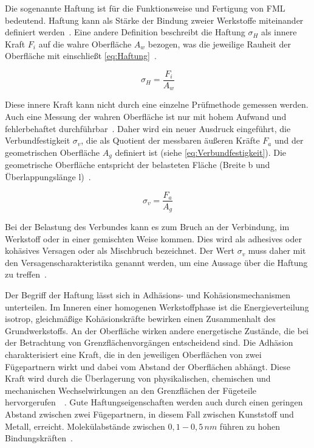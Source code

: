Die sogenannte Haftung ist für die Funktionsweise und Fertigung von FML bedeutend.
Haftung kann als Stärke der Bindung zweier Werkstoffe miteinander definiert werden~\cite{Mann1994}.
Eine andere Definition beschreibt die Haftung $\sigma_H$ als innere Kraft $F_i$ auf die wahre Oberfläche $A_w$ bezogen, was die jeweilige Rauheit der Oberfläche mit einschließt \autoref{eq:Haftung}~\cite{Bischof1993}.

\begin{equation}
    \sigma_H = \frac{F_i}{A_w}
    \label{eq:Haftung}
\end{equation}

Diese innere Kraft kann nicht durch eine einzelne Prüfmethode gemessen werden.
Auch eine Messung der wahren Oberfläche ist nur mit hohem Aufwand und fehlerbehaftet durchführbar~\cite{Brockmann1969}.
Daher wird ein neuer Ausdruck eingeführt, die Verbundfestigkeit $\sigma_v$, die als Quotient der messbaren äußeren Kräfte $F_a$ und der geometrischen Oberfläche $A_g$ definiert ist (siehe \autoref{eq:Verbundfestigkeit}).
Die geometrische Oberfläche entspricht der belasteten Fläche (Breite b und Überlappungslänge l)~\cite{Habenicht2009}.

\begin{equation}
    \sigma_v = \frac{F_a}{A_g}
    \label{eq:Verbundfestigkeit}
\end{equation}

Bei der Belastung des Verbundes kann es zum Bruch an der Verbindung, im Werkstoff oder in einer gemischten Weise kommen.
Dies wird als adhesives oder kohäsives Versagen oder als Mischbruch bezeichnet.
Der Wert $\sigma_v$ muss daher mit den Versagenscharakteristika genannt werden, um eine Aussage über die Haftung zu treffen~\cite{Pan2016}.

Der Begriff der Haftung lässt sich in Adhäsions- und Kohäsionsmechanismen unterteilen.
Im Inneren einer homogenen Werkstoffphase ist die Energieverteilung isotrop, gleichmäßige Kohäsionskräfte bewirken einen Zusammenhalt des Grundwerkstoffs.
An der Oberfläche wirken andere energetische Zustände, die bei der Betrachtung von Grenzflächenvorgängen entscheidend sind.
Die Adhäsion charakterisiert eine Kraft, die in den jeweiligen Oberflächen von zwei Fügepartnern wirkt und dabei vom Abstand der Oberflächen abhängt.
Diese Kraft wird durch die Überlagerung von physikalischen, chemischen und mechanischen Wechselwirkungen an den Grenzflächen der Fügeteile hervorgerufen~\cite{Habenicht2009}~.
Gute Haftungseigenschaften werden auch durch einen geringen Abstand zwischen zwei Fügepartnern, in diesem Fall zwischen Kunststoff und Metall, erreicht.
Molekülabstände zwischen $0,1 - 0,5\, nm$ führen zu hohen Bindungskräften~\cite{Suchentrunk2007}.

